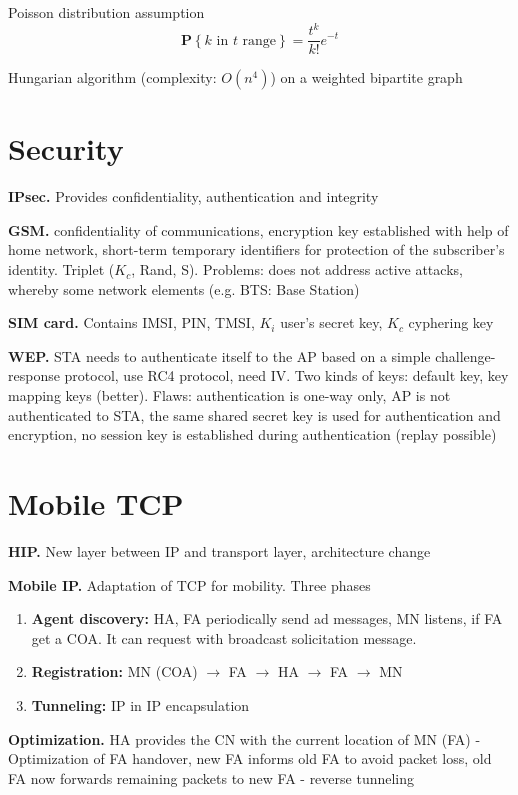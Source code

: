 \documentclass[10pt,twocolumn]{article}
\renewcommand{\l}{\left}
\renewcommand{\r}{\right}
\renewcommand{\bf}{\textbf}
\renewcommand{\P}[1]{\mathbf{P}\l\{#1\r\}}
\begin{document}
Poisson distribution assumption
\[
  \P{k \text{ in } t \text{ range}} = \frac{t^k}{k!}e^{-t} 
\]


Hungarian algorithm (complexity: $O(n^4)$) on a weighted bipartite graph

\section{Security}

\bf{IPsec.} Provides confidentiality, authentication and integrity

\bf{GSM.} confidentiality of communications, encryption key established with help of home network, short-term temporary identifiers for protection of the subscriber’s identity. Triplet ($K_c$, Rand, S). Problems: does not address active attacks, whereby some network elements (e.g. BTS: Base Station)

\bf{SIM card.} Contains IMSI, PIN, TMSI, $K_i$ user's secret key, $K_c$ cyphering key

\bf{WEP.} STA needs to authenticate itself to the AP based on a simple challenge-response protocol, use RC4 protocol, need IV. Two kinds of keys: default key, key mapping keys (better). Flaws: authentication is one-way only, AP is not authenticated to STA, the same shared secret key is used for authentication and encryption, no session key is established during authentication (replay possible)

\section{Mobile TCP}

\bf{HIP.} New layer between IP and transport layer, architecture change

\bf{Mobile IP.} Adaptation of TCP for mobility. Three phases
\begin{enumerate}
  \item \bf{Agent discovery:} HA, FA periodically send ad messages, MN listens, if FA get a COA. It can request with broadcast solicitation message.
  \item \bf{Registration:} MN (COA) $\to$ FA $\to$ HA $\to$ FA $\to$ MN
  \item \bf{Tunneling:} IP in IP encapsulation
\end{enumerate}

\bf{Optimization.}  HA provides the CN with the current location of MN (FA) - Optimization of FA handover,  new FA informs old FA to avoid packet loss, old FA now forwards remaining packets to new FA - reverse tunneling
\end{document}
